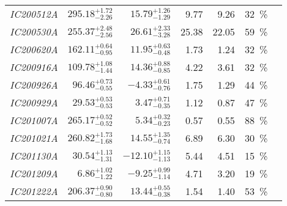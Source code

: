 \begin{table*}
\begin{tabular}{l r r r r c c}
        \emph{IC200512A} & $295.18^{+1.72}_{-2.26}$ & $15.79^{+1.26}_{-1.29}$  & 9.77                 & 9.26                 & \SI{32}{\percent}  & \cite{IC200512A1, IC200512A2}                         \\
        \emph{IC200530A} & $255.37^{+2.48}_{-2.56}$ & $26.61^{+2.33}_{-3.28}$  & 25.38                & 22.05                & \SI{59}{\percent}  & \cite{IC200530A1, IC200530A2, IC200530A3, IC200530A4} \\
        \emph{IC200620A} & $162.11^{+0.64}_{-0.95}$ & $11.95^{+0.63}_{-0.48}$  & 1.73                 & 1.24                 & \SI{32}{\percent}  & \cite{IC200620A1, IC200620A2}                         \\
        \emph{IC200916A} & $109.78^{+1.08}_{-1.44}$ & $14.36^{+0.88}_{-0.85}$  & 4.22                 & 3.61                 & \SI{32}{\percent}  & \cite{IC200916A1, IC200916A2, IC200916A3}             \\
        \emph{IC200926A} & $96.46^{+0.73}_{-0.55}$  & $-4.33^{+0.61}_{-0.76}$  & 1.75                 & 1.29                 & \SI{44}{\percent}  & \cite{IC200926A1, IC200926A2}                         \\
        \emph{IC200929A} & $29.53^{+0.53}_{-0.53}$  & $3.47^{+0.71}_{-0.35}$   & 1.12                 & 0.87                 & \SI{47}{\percent}  & \cite{IC200929A1, IC200929A2}                         \\
        \emph{IC201007A} & $265.17^{+0.52}_{-0.52}$ & $5.34^{+0.32}_{-0.23}$   & 0.57                 & 0.55                 & \SI{88}{\percent}  & \cite{IC201007A1, IC201007A2}                         \\
        \emph{IC201021A} & $260.82^{+1.73}_{-1.68}$ & $14.55^{+1.35}_{-0.74}$  & 6.89                 & 6.30                 & \SI{30}{\percent}  & \cite{IC201021A1, IC201021A2}                         \\
        \emph{IC201130A} & $30.54^{+1.13}_{-1.31}$  & $-12.10^{+1.15}_{-1.13}$ & 5.44                 & 4.51                 & \SI{15}{\percent}  & \cite{IC201130A1, IC201130A2}                         \\
        \emph{IC201209A} & $6.86^{+1.02}_{-1.22}$   & $-9.25^{+0.99}_{-1.14}$  & 4.71                 & 3.20                 & \SI{19}{\percent}  & \cite{IC201209A1, IC201209A2}                         \\
        \emph{IC201222A} & $206.37^{+0.90}_{-0.80}$ & $13.44^{+0.55}_{-0.38}$  & 1.54                 & 1.40                 & \SI{53}{\percent}  & \cite{IC201222A1, IC201222A2}                         \\

\end{tabular}
\end{table*}
